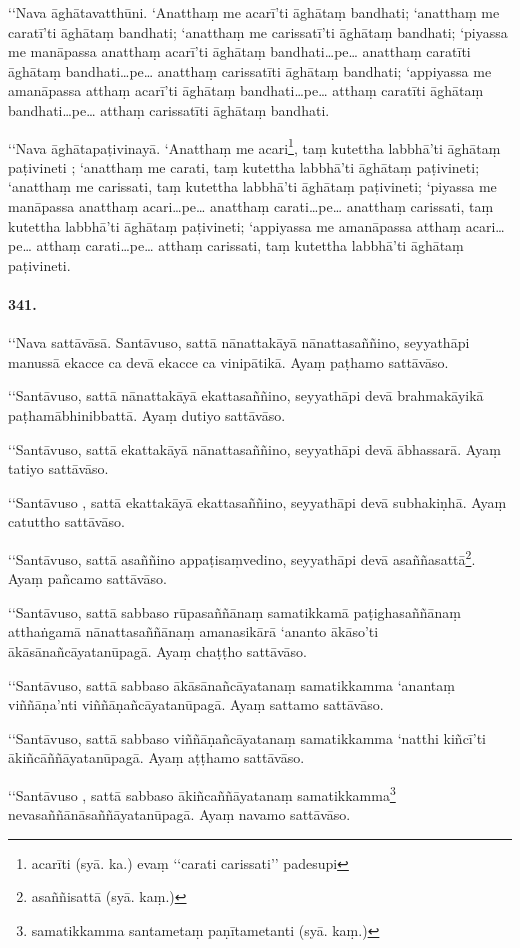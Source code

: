 ‘‘Nava āghātavatthūni. ‘Anatthaṃ me acarī’ti āghātaṃ bandhati; ‘anatthaṃ me caratī’ti āghātaṃ bandhati; ‘anatthaṃ me carissatī’ti āghātaṃ bandhati; ‘piyassa me manāpassa anatthaṃ acarī’ti āghātaṃ bandhati…pe… anatthaṃ caratīti āghātaṃ bandhati…pe… anatthaṃ carissatīti āghātaṃ bandhati; ‘appiyassa me amanāpassa atthaṃ acarī’ti āghātaṃ bandhati…pe… atthaṃ caratīti āghātaṃ bandhati…pe… atthaṃ carissatīti āghātaṃ bandhati.

‘‘Nava āghātapaṭivinayā. ‘Anatthaṃ me acari\footnote{acarīti (syā. ka.) evaṃ ‘‘carati carissati’’ padesupi}, taṃ kutettha labbhā’ti āghātaṃ paṭivineti ; ‘anatthaṃ me carati, taṃ kutettha labbhā’ti āghātaṃ paṭivineti; ‘anatthaṃ me carissati, taṃ kutettha labbhā’ti āghātaṃ paṭivineti; ‘piyassa me manāpassa anatthaṃ acari…pe… anatthaṃ carati…pe… anatthaṃ carissati, taṃ kutettha labbhā’ti āghātaṃ paṭivineti; ‘appiyassa me amanāpassa atthaṃ acari…pe… atthaṃ carati…pe… atthaṃ carissati, taṃ kutettha labbhā’ti āghātaṃ paṭivineti.

\paragraph{341.} ‘‘Nava sattāvāsā. Santāvuso, sattā nānattakāyā nānattasaññino, seyyathāpi manussā ekacce ca devā ekacce ca vinipātikā. Ayaṃ paṭhamo sattāvāso.

‘‘Santāvuso, sattā nānattakāyā ekattasaññino, seyyathāpi devā brahmakāyikā paṭhamābhinibbattā. Ayaṃ dutiyo sattāvāso.

‘‘Santāvuso, sattā ekattakāyā nānattasaññino, seyyathāpi devā ābhassarā. Ayaṃ tatiyo sattāvāso.

‘‘Santāvuso , sattā ekattakāyā ekattasaññino, seyyathāpi devā subhakiṇhā. Ayaṃ catuttho sattāvāso.

‘‘Santāvuso, sattā asaññino appaṭisaṃvedino, seyyathāpi devā asaññasattā\footnote{asaññisattā (syā. kaṃ.)}. Ayaṃ pañcamo sattāvāso.

‘‘Santāvuso, sattā sabbaso rūpasaññānaṃ samatikkamā paṭighasaññānaṃ atthaṅgamā nānattasaññānaṃ amanasikārā ‘ananto ākāso’ti ākāsānañcāyatanūpagā. Ayaṃ chaṭṭho sattāvāso.

‘‘Santāvuso, sattā sabbaso ākāsānañcāyatanaṃ samatikkamma ‘anantaṃ viññāṇa’nti viññāṇañcāyatanūpagā. Ayaṃ sattamo sattāvāso.

‘‘Santāvuso, sattā sabbaso viññāṇañcāyatanaṃ samatikkamma ‘natthi kiñcī’ti ākiñcāññāyatanūpagā. Ayaṃ aṭṭhamo sattāvāso.

‘‘Santāvuso , sattā sabbaso ākiñcaññāyatanaṃ samatikkamma\footnote{samatikkamma santametaṃ paṇītametanti (syā. kaṃ.)} nevasaññānāsaññāyatanūpagā. Ayaṃ navamo sattāvāso.

